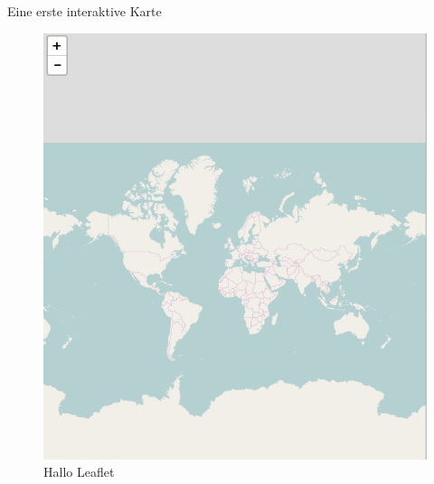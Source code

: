 \documentclass[ignorenonframetext,]{beamer}
\newenvironment{Shaded}{\begin{snugshade}}{\end{snugshade}}
\newcommand{\KeywordTok}[1]{\textcolor[rgb]{0.26,0.66,0.93}{\textbf{#1}}}
\newcommand{\NormalTok}[1]{\textcolor[rgb]{0.74,0.68,0.62}{#1}}
\newcommand{\OperatorTok}[1]{\textcolor[rgb]{0.74,0.68,0.62}{#1}}
\newcommand{\StringTok}[1]{\textcolor[rgb]{0.02,0.61,0.04}{#1}}
\begin{document}
\begin{frame}[fragile]{Eine erste interaktive Karte}
\protect\hypertarget{eine-erste-interaktive-karte}{}

\begin{Shaded}
\end{Shaded}

\begin{figure}
\centering
\includegraphics{figure/FirstLeaflet.PNG}
\caption{Hallo Leaflet}
\end{figure}

\end{frame}
\end{document}
